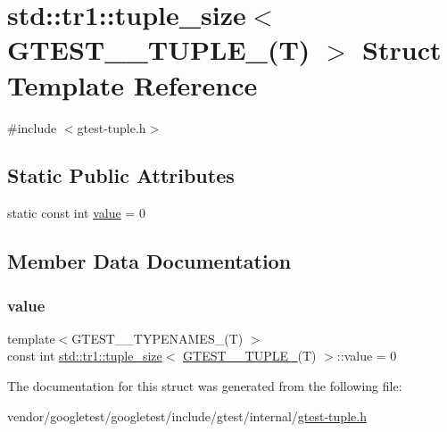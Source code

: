 \hypertarget{structstd_1_1tr1_1_1tuple__size_3_01_g_t_e_s_t__0___t_u_p_l_e___07_t_08_01_4}{}\section{std\+:\+:tr1\+:\+:tuple\+\_\+size$<$ G\+T\+E\+S\+T\+\_\+\_\+\+T\+U\+P\+L\+E\+\_\+(T) $>$ Struct Template Reference}
\label{structstd_1_1tr1_1_1tuple__size_3_01_g_t_e_s_t__0___t_u_p_l_e___07_t_08_01_4}


{\ttfamily \#include $<$gtest-\/tuple.\+h$>$}

\subsection*{Static Public Attributes}
\begin{DoxyCompactItemize}
\item 
static const int \hyperlink{structstd_1_1tr1_1_1tuple__size_3_01_g_t_e_s_t__0___t_u_p_l_e___07_t_08_01_4_af34d6d0b87d7379b14817a386c1e18ee}{value} = 0
\end{DoxyCompactItemize}


\subsection{Member Data Documentation}
\mbox{\label{structstd_1_1tr1_1_1tuple__size_3_01_g_t_e_s_t__0___t_u_p_l_e___07_t_08_01_4_af34d6d0b87d7379b14817a386c1e18ee}} 
\subsubsection{\texorpdfstring{value}{value}}
{\footnotesize\ttfamily template$<$G\+T\+E\+S\+T\+\_\+\_\+\+T\+Y\+P\+E\+N\+A\+M\+E\+S\+\_\+(\+T) $>$ \\
const int \hyperlink{structstd_1_1tr1_1_1tuple__size}{std\+::tr1\+::tuple\+\_\+size}$<$ \hyperlink{gtest-tuple_8h_acecddf48fa29ec4b0199d5a467e89778}{G\+T\+E\+S\+T\+\_\+\_\+\+T\+U\+P\+L\+E\+\_\+}(T) $>$\+::value = 0\hspace{0.3cm}{\ttfamily [static]}}



The documentation for this struct was generated from the following file\+:\begin{DoxyCompactItemize}
\item 
vendor/googletest/googletest/include/gtest/internal/\hyperlink{gtest-tuple_8h}{gtest-\/tuple.\+h}\end{DoxyCompactItemize}
